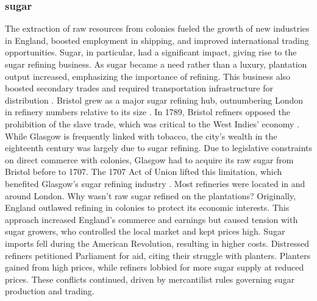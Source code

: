 \subsubsection{sugar}
The extraction of raw resources from colonies fueled the growth of new industries in England, boosted employment in shipping, and improved international trading opportunities. Sugar, in particular, had a significant impact, giving rise to the sugar refining business. As sugar became a need rather than a luxury, plantation output increased, emphasizing the importance of refining. This business also boosted secondary trades and required transportation infrastructure for distribution . Bristol grew as a major sugar refining hub, outnumbering London in refinery numbers relative to its size . In 1789, Bristol refiners opposed the prohibition of the slave trade, which was critical to the West Indies' economy . While Glasgow is frequently linked with tobacco, the city's wealth in the eighteenth century was largely due to sugar refining. Due to legislative constraints on direct commerce with colonies, Glasgow had to acquire its raw sugar from Bristol before to 1707. The 1707 Act of Union lifted this limitation, which benefited Glasgow's sugar refining industry . Most refineries were located in and around London. Why wasn't raw sugar refined on the plantations? Originally, England outlawed refining in colonies to protect its economic interests. This approach increased England's commerce and earnings  but caused tension with sugar growers, who controlled the local market and kept prices high. Sugar imports fell during the American Revolution, resulting in higher costs. Distressed refiners petitioned Parliament for aid, citing their struggle with planters. Planters gained from high prices, while refiners lobbied for more sugar supply at reduced prices. These conflicts continued, driven by mercantilist rules governing sugar production and trading.

